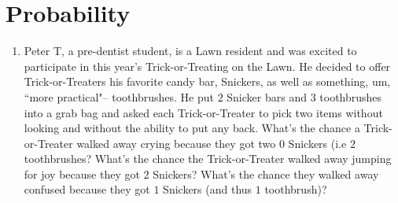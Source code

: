\documentclass[10pt]{article}
\begin{document}
\newpage
\section{Probability}
\begin{enumerate}
\item Peter T, a pre-dentist student,  is a Lawn resident and was excited to participate in this year's Trick-or-Treating on the Lawn. He decided to offer Trick-or-Treaters his favorite candy bar, Snickers, as well as something, um, ``more practical"-- toothbrushes.   He put $2$ Snicker bars and $3$ toothbrushes into a grab bag and asked each Trick-or-Treater to pick two items without looking and without the ability to put any back. What's the chance a Trick-or-Treater  walked away crying because they got two $0$ Snickers (i.e $2$ toothbrushes?  What's the chance the Trick-or-Treater walked away jumping for joy because they got $2$ Snickers? What's the chance they walked away confused because they got $1$ Snickers (and thus $1$ toothbrush)?


\end{enumerate}
\end{document}

